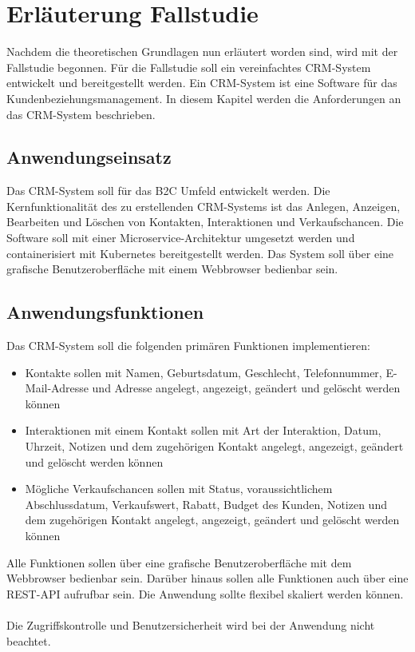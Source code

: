 \section{Erläuterung Fallstudie}
Nachdem die theoretischen Grundlagen nun erläutert worden sind, wird mit der Fallstudie begonnen. Für die Fallstudie soll ein vereinfachtes \ac{CRM}-System entwickelt und bereitgestellt werden. Ein \ac{CRM}-System ist eine Software für das Kundenbeziehungsmanagement. In diesem Kapitel werden die Anforderungen an das \ac{CRM}-System beschrieben.

\subsection{Anwendungseinsatz}
Das CRM-System soll für das \ac{B2C} Umfeld entwickelt werden. Die Kernfunktionalität des zu erstellenden CRM-Systems ist das Anlegen, Anzeigen, Bearbeiten und Löschen von Kontakten, Interaktionen und Verkaufschancen. Die Software soll mit einer Microservice-Architektur umgesetzt werden und containerisiert mit Kubernetes bereitgestellt werden. Das System soll über eine grafische Benutzeroberfläche mit einem Webbrowser bedienbar sein.

\subsection{Anwendungsfunktionen}
Das CRM-System soll die folgenden primären Funktionen implementieren:
\begin{itemize}
\item Kontakte sollen mit Namen, Geburtsdatum, Geschlecht, Telefonnummer, E-Mail-Adresse und Adresse angelegt, angezeigt, geändert und gelöscht werden können
\item Interaktionen mit einem Kontakt sollen mit Art der Interaktion, Datum, Uhrzeit, Notizen und dem zugehörigen Kontakt angelegt, angezeigt, geändert und gelöscht werden können
\item Mögliche Verkaufschancen sollen mit Status, voraussichtlichem Abschlussdatum, Verkaufswert, Rabatt, Budget des Kunden, Notizen und dem zugehörigen Kontakt angelegt, angezeigt, geändert und gelöscht werden können
\end{itemize} 

Alle Funktionen sollen über eine grafische Benutzeroberfläche mit dem Webbrowser bedienbar sein. Darüber hinaus sollen alle Funktionen auch über eine REST-API aufrufbar sein. Die Anwendung sollte flexibel skaliert werden können. \\
\\
Die Zugriffskontrolle und Benutzersicherheit wird bei der Anwendung nicht beachtet.

